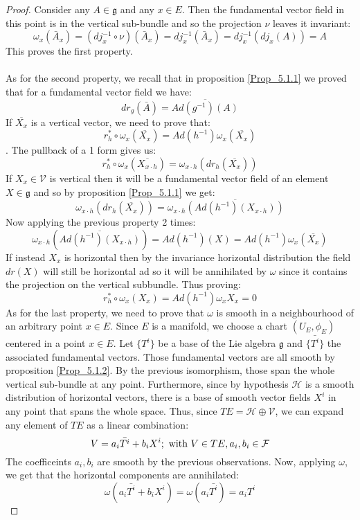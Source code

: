 \documentclass[12pt,a4paper]{report}
\theoremstyle{definition}
\theoremstyle{Theorem}
\theoremstyle{definition}
\theoremstyle{definition}
\begin{document}
		\begin{proof}
			Consider any $A\in\mathfrak{g}$ and any $x\in E$. Then the fundamental vector field in this point is in the vertical sub-bundle and so the projection $\nu$ leaves it invariant:
			$$\omega_{x}(\bar{A}_{x})=(dj_{x}^{-1}\circ \nu)(\bar{A}_{x})=dj_{x}^{-1}(\bar{A}_{x})=
			dj_{x}^{-1}(dj_{x}(A))=A$$
			This proves the first property.\\
			\\
			As for the second property, we recall that in proposition \ref{Prop_5.1.1} we proved that for a fundamental vector field  we have:
			$$dr_g(\bar{A})=\overline{Ad(g^{-1})(A)}$$
			If $\overline{X_x}$ is a vertical vector, we need to prove that:
			$$r^*_h\circ \omega_{x}(\overline{X_{x}})=Ad(h^{-1})\omega_{x}(\overline{X_{x}})$$. 
			The pullback of a 1 form gives us:
			$$r^*_h\circ \omega_{x}(\overline{X_{x\cdot h}})=\omega_{x\cdot h}(dr_h(\overline{X_{x}}))$$
			If $X_{x}\in\mathcal{V}$ is vertical then it will be a fundamental vector field of an element $X\in\mathfrak{g}$ and so by proposition \ref{Prop_5.1.1} we get:
			$$\omega_{x\cdot h}(dr_h(\overline{X_{x}}))=\omega_{x\cdot h}\overline{(Ad(h^{-1})(X_{x\cdot h}))}$$
			Now applying the previous property 2 times:
			$$\omega_{x\cdot h}(\overline{Ad(h^{-1})(X_{x\cdot h})})=Ad(h^{-1})(X)=Ad(h^{-1})\omega_{x}(\overline{X_{x}})$$
			If instead $X_{x}$ is horizontal then by the invariance horizontal distribution the field $dr(X)$ will still be horizontal ad so it will be annihilated by $\omega$ since it contains the projection on the vertical subbundle. Thus proving:
			$$r^*_h\circ \omega_{x}(X_{x})=Ad(h^{-1})\omega_{x}X_{x}=0$$
			As for the last property, we need to prove that $\omega$ is smooth in a neighbourhood of an arbitrary point $x\in E$. Since $E$ is a manifold, we choose a chart $(U_E,\phi_E)$ centered in a point $x\in E$. Let $\{T^i\}$ be a base of the Lie algebra $\mathfrak{g}$ and $\{\bar{T^i}\}$ the associated fundamental vectors. Those fundamental vectors are all smooth by proposition \ref{Prop_5.1.2}. By the previous isomorphism, those span the whole vertical sub-bundle at any point. Furthermore, since by hypothesis $\mathcal{H}$ is a smooth distribution  of horizontal vectors, there is a base of smooth vector fields $X^i$ in any point that spans the whole space. Thus, since $TE=\mathcal{H}\oplus\mathcal{V}$, we can expand any element of $TE$ as a linear combination:
			$$V=a_i \bar{T^i}+b_iX^i;\hbox{ with } V\in TE, a_i,b_i\in \mathcal{F}$$
			The coefficeints $a_i,b_i$ are smooth by the previous observations. Now, applying $\omega$, we get that the horizontal components are annihilated:
			$$\omega(a_i \bar{T^i}+b_iX^i)=\omega(a_i \bar{T^i})=a_i T^i$$
		\end{proof}
\end{document}

